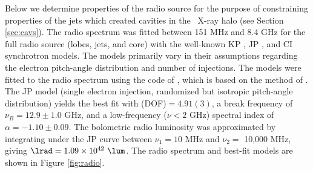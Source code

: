 \documentclass[useAMS,usenatbib]{mn2e}
\begin{document}
Below we determine properties of the radio source for the purpose of
constraining properties of the jets which created cavities in the
\rxj\ X-ray halo (see Section \ref{sec:cavs}). The radio spectrum was
fitted between 151 MHz and 8.4 GHz for the full radio source (lobes,
jets, and core) with the well-known KP \citep{1962SvA.....6..317K,
  pach}, JP \citep{1973A&A....26..423J}, and CI
\citep{1987MNRAS.225..335H} synchrotron models. The models primarily
vary in their assumptions regarding the electron pitch-angle
distribution and number of injections. The models were fitted to the
radio spectrum using the code of \citet{2005ApJ...624..656W}, which is
based on the method of \citet{1991ApJ...383..554C}. The JP model
(single electron injection, randomized but isotropic pitch-angle
distribution) yields the best fit with \chisq(DOF)$ = 4.91(3)$, a
break frequency of $\nu_B = 12.9 \pm 1.0$ GHz, and a low-frequency
($\nu < 2$ GHz) spectral index of $\alpha = -1.10 \pm 0.09$. The
bolometric radio luminosity was approximated by integrating under the
JP curve between $\nu_1 = 10$ MHz and $\nu_2 =$ 10,000 MHz, giving
$\lrad = 1.09 \times 10^{42}~\lum$. The radio spectrum and best-fit
models are shown in Figure \ref{fig:radio}.
\end{document}
